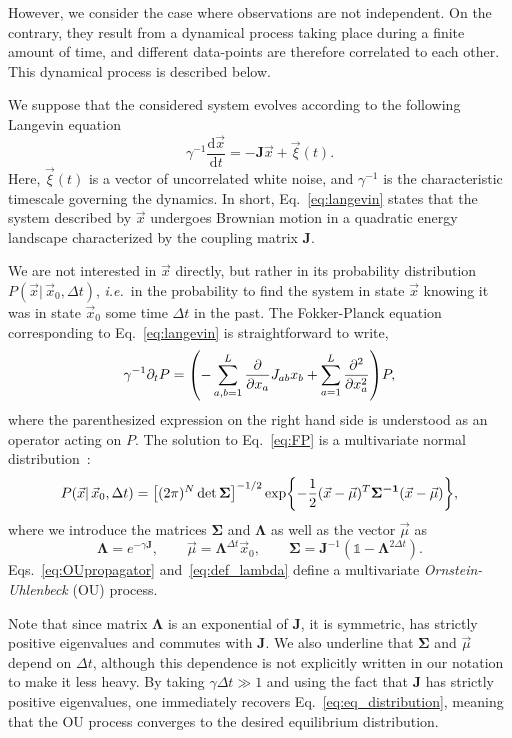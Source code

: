 \documentclass[preprint,amsmath,amssymb,superscriptaddress,showpacs,pre]{revtex4-1}
\let\originalleft\left
\let\originalright\right
\renewcommand{\left}{\mathopen{}\mathclose\bgroup\originalleft}
\renewcommand{\right}{\aftergroup\egroup\originalright}
\newcommand{\ie}{\emph{i.e.}}
\def\vx{\vec x}
\newcommand{\Lam}{\bm{\Lambda}}
\newcommand{\Sig}{\bm{\Sigma}}
\newcommand{\curlynormal}[1]{\exp\left\{-\frac{1}{2} #1 \right\}}
\newcommand{\iSig}{\bm{\Sigma^{-1}}}
\begin{document}
However, we consider the case where observations are not independent. 
On the contrary, they result from a dynamical process taking place during a finite amount of time, and different data-points are therefore correlated to each other.
This dynamical process is described below.

We suppose that the considered system evolves according to the following Langevin equation 
\begin{equation}
	\gamma^{-1}\frac{\text{d}\vx}{\text{d}t} = - \bm{J}\vx + \vec{\xi}(t).
	\label{eq:langevin}
\end{equation}
Here, $\vec{\xi}(t)$ is a vector of uncorrelated white noise, and $\gamma^{-1}$ is the characteristic timescale governing the dynamics. 
In short, Eq.~\eqref{eq:langevin} states that the system described by $\vx$ undergoes Brownian motion in a quadratic energy landscape characterized by the coupling matrix $\bm{J}$. 

We are not interested in $\vx$ directly, but rather in its probability distribution $P(\vx\vert\,\vx_0,\Delta t)$, \ie~in the probability to find the system in state $\vx$ knowing it was in state $\vx_0$ some time $\Delta t$ in the past. 
The Fokker-Planck equation corresponding to Eq.~\eqref{eq:langevin} is straightforward to write, 
\begin{equation}
	\gamma^{-1} \partial_t P = \left(-\sum_{a,b=1}^L\frac{\partial}{\partial x_a} J_{ab}x_b + \sum_{a=1}^L\frac{\partial^2}{\partial x_a^2}\right) P, 
	\label{eq:FP}
\end{equation}
where the parenthesized expression on the right hand side is understood as an operator acting on $P$. 
The solution to Eq.~\eqref{eq:FP} is a multivariate normal distribution~\cite{singh2017multiOU}:
\begin{equation}
	P(\vx|\, \vx_0, \Delta t) = \left[(2\pi)^N\det\Sig\right]^{-1/2}
	\curlynormal{(\vx-\vec{\mu})^T\iSig(\vx- \vec{\mu})},
	\label{eq:OUpropagator}
\end{equation}
where we introduce the matrices $\Sig$ and $\Lam$ as well as the vector $\vec{\mu}$ as 
\begin{equation}
	\Lam = e^{-\gamma\bm{J}}, \qquad \vec{\mu} = \Lam^{\Delta t} \vx_0, \qquad \Sig = \bm{J}^{-1}(\mathbb{1} - \Lam^{2 \Delta t}).
	\label{eq:def_lambda}
\end{equation}
Eqs.~\eqref{eq:OUpropagator} and~\eqref{eq:def_lambda} define a multivariate \emph{Ornstein-Uhlenbeck} (OU) process. 

Note that since matrix $\Lam$ is an exponential of $\bm{J}$, it is symmetric, has strictly positive eigenvalues and commutes with $\bm{J}$. 
We also underline that $\Sig$ and $\vec{\mu}$ depend on $\Delta t$, although this dependence is not explicitly written in our notation to make it less heavy. 
By taking $\gamma\Delta t \gg 1$ and using the fact that $\bm{J}$ has strictly positive eigenvalues, one immediately recovers Eq.~\eqref{eq:eq_distribution}, meaning that the OU process converges to the desired equilibrium distribution.
\end{document}
